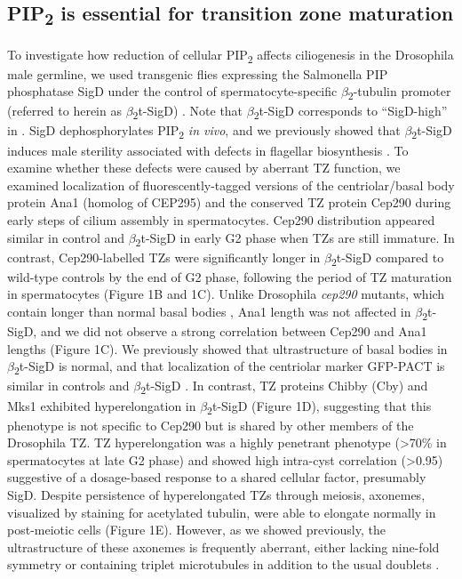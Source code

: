 \documentclass[12pt, twoside, letterpaper]{article}
\newcommand{\PIP}{PIP\textsubscript{2}}
\newcommand{\sigd}{$\beta$\textsubscript{2}t-SigD}
\begin{document}
\begin{doublespacing}
\begin{linenumbers}
    \subsection*{\PIP{} is essential for transition zone maturation}
    To investigate how reduction of cellular \PIP{} affects ciliogenesis in the
    Drosophila male germline,
    we used transgenic flies expressing the Salmonella PIP phosphatase SigD
    under the control of spermatocyte-specific $\beta$\textsubscript{2}-tubulin promoter
    (referred to herein as \sigd{})
    \citep{wei2008depletion}.
    Note that \sigd{} corresponds to ``SigD-high'' in \citep{fabian2010phosphatidylinositol}.
    SigD dephosphorylates \PIP{} \textit{in vivo},
    and we previously showed that \sigd{} induces male sterility
    associated with defects in flagellar biosynthesis \citep{wei2008depletion}.
    To examine whether these defects were caused by aberrant TZ function,
    we examined localization of fluorescently-tagged versions of the
    centriolar/basal body protein
    Ana1 (homolog of CEP295) \citep{goshima2007genes, blachon2009proximal}
    and the conserved TZ protein Cep290 \citep{basiri2014migrating}
    during early steps of cilium assembly in spermatocytes.
    Cep290 distribution appeared similar in control and \sigd{} in early G2 phase
    when TZs are still immature.
    In contrast, Cep290-labelled TZs were significantly longer in \sigd{}
    compared to wild-type controls by the end of G2 phase, following
    the period of TZ maturation in spermatocytes (Figure 1B and 1C).
    Unlike Drosophila \textit{cep290} mutants, which contain
    longer than normal basal bodies \citep{basiri2014migrating},
    Ana1 length was not affected in \sigd{},
    and we did not observe a strong
    correlation between Cep290 and Ana1 lengths (Figure 1C).
    We previously showed that ultrastructure of basal bodies in \sigd{}
    is normal, and that localization of the centriolar
    marker GFP-PACT \citep{basto2006flies}
    is similar in controls and \sigd{} \citep{wei2008depletion}.
    In contrast, TZ proteins Chibby (Cby) \citep{enjolras2012drosophila} and
    Mks1 \citep{vieillard2016transition}
    exhibited hyperelongation in \sigd{} (Figure 1D),
    suggesting that this phenotype is not specific to Cep290 but is shared
    by other members of the Drosophila TZ.
    TZ hyperelongation was a highly penetrant phenotype (\textgreater 70\%
    in spermatocytes at late G2 phase)
    and showed high intra-cyst correlation (\textgreater 0.95) suggestive
    of a dosage-based response to a shared cellular factor,
    presumably SigD.
    Despite persistence of hyperelongated TZs through meiosis,
    axonemes, visualized by staining for acetylated tubulin, were able to
    elongate normally in post-meiotic cells (Figure 1E).
    However, as we showed previously, the ultrastructure of these axonemes
    is frequently aberrant,
    either lacking nine-fold symmetry or containing triplet microtubules
    in addition to the usual doublets \citep{wei2008depletion}.


\end{linenumbers}
\end{doublespacing}
\end{document}
